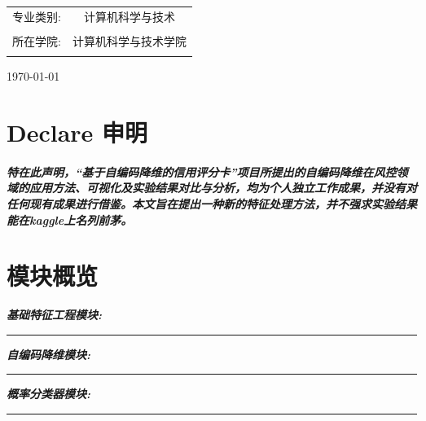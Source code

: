 \documentclass[11pt]{article}
\begin{document}
\begin{titlepage}
\begin{center}
\begin{center}
\begin{large}
\begin{tabular}{cc}
					\cline{2-2}                                       \\
					专业类别:    & 计算机科学与技术                   \\
					\cline{2-2}                                       \\
					所在学院:    & 计算机科学与技术学院               \\
					\cline{2-2}                                       \\
				\end{tabular}
			\end{large}
		\end{center}
		\LARGE\today
	\end{center}

\end{titlepage}



\newpage
\thispagestyle{empty} %

\section*{\LARGE  Declare 申明}
\paragraph{}
\textit{\bfseries \songti
	特在此声明，“基于自编码降维的信用评分卡”项目所提出的自编码降维在风控领域的应用方法、可视化及实验结果对比与分析，均为个人独立工作成果，并没有对任何现有成果进行借鉴。本文旨在提出一种新的特征处理方法，并不强求实验结果能在kaggle上名列前茅。}
\section*{\LARGE  模块概览}

\noindent  \textit{\bfseries \songti 基础特征工程模块:} \\[1mm]
\rule[1em]{30em}{0.5pt}

\noindent  \textit{\bfseries \songti 自编码降维模块:}\\[1mm]
\rule[1em]{30em}{0.5pt}

\noindent \textit{\bfseries \songti 概率分类器模块:}\\[1mm]
\rule[1em]{30em}{0.5pt}
\end{document}
